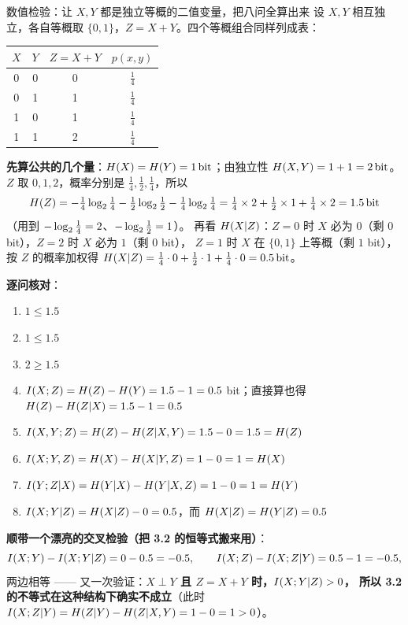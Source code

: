 \documentclass[11pt,a4paper]{ctexart}
\begin{document}
\begin{calc}{数值检验：让 $X,Y$ 都是独立等概的二值变量，把八问全算出来}
设 $X,Y$ 相互独立，各自等概取 $\{0,1\}$，$Z=X+Y$。四个等概组合同样列成表：

\begin{center}
\renewcommand{\arraystretch}{1.3}
\begin{tabular}{c|c|c|c}
\toprule
$X$ & $Y$ & $Z=X+Y$ & $p(x,y)$ \\
\midrule
0 & 0 & 0 & $\frac14$ \\
0 & 1 & 1 & $\frac14$ \\
1 & 0 & 1 & $\frac14$ \\
1 & 1 & 2 & $\frac14$ \\
\bottomrule
\end{tabular}
\end{center}

\textbf{先算公共的几个量}：$H\!\left(X\right)=H\!\left(Y\right)=1\,\text{bit}$；由独立性 $H\!\left(X,Y\right)=1+1=2\,\text{bit}$。
$Z$ 取 $0,1,2$，概率分别是 $\frac14,\frac12,\frac14$，所以
\[
H\!\left(Z\right)=-\tfrac14\log_{2}\tfrac14-\tfrac12\log_{2}\tfrac12-\tfrac14\log_{2}\tfrac14
=\tfrac14\times2+\tfrac12\times1+\tfrac14\times2=1.5\,\text{bit}
\]
（用到 $-\log_{2}\tfrac14=2$、$-\log_{2}\tfrac12=1$）。
再看 $H\!\left(X|Z\right)$：$Z=0$ 时 $X$ 必为 $0$（剩 $0$ bit），$Z=2$ 时 $X$ 必为 $1$（剩 $0$ bit），
$Z=1$ 时 $X$ 在 $\{0,1\}$ 上等概（剩 $1$ bit），按 $Z$ 的概率加权得
$H\!\left(X|Z\right)=\tfrac14\cdot0+\tfrac12\cdot1+\tfrac14\cdot0=0.5\,\text{bit}$。

\textbf{逐问核对}：
\begin{enumerate}[label=(\arabic*),leftmargin=1.9em,itemsep=1pt,topsep=1pt]
  \item $1\le1.5$ \checkmark
  \item $1\le1.5$ \checkmark
  \item $2\ge1.5$ \checkmark
  \item $I\!\left(X;Z\right)=H\!\left(Z\right)-H\!\left(Y\right)=1.5-1=0.5$ bit；直接算也得 $H\!\left(Z\right)-H\!\left(Z|X\right)=1.5-1=0.5$ \checkmark
  \item $I\!\left(X,Y;Z\right)=H\!\left(Z\right)-H\!\left(Z|X,Y\right)=1.5-0=1.5=H\!\left(Z\right)$ \checkmark
  \item $I\!\left(X;Y,Z\right)=H\!\left(X\right)-H\!\left(X|Y,Z\right)=1-0=1=H\!\left(X\right)$ \checkmark
  \item $I\!\left(Y;Z|X\right)=H\!\left(Y|X\right)-H\!\left(Y|X,Z\right)=1-0=1=H\!\left(Y\right)$ \checkmark
  \item $I\!\left(X;Y|Z\right)=H\!\left(X|Z\right)-0=0.5$，而 $H\!\left(X|Z\right)=H\!\left(Y|Z\right)=0.5$ \checkmark
\end{enumerate}

\textbf{顺带一个漂亮的交叉检验（把 3.2 的恒等式搬来用）}：
\[
I\!\left(X;Y\right)-I\!\left(X;Y|Z\right)=0-0.5=-0.5,
\qquad
I\!\left(X;Z\right)-I\!\left(X;Z|Y\right)=0.5-1=-0.5,
\]
两边相等 \checkmark —— 又一次验证：\textbf{$X\perp Y$ 且 $Z=X+Y$ 时，$I\!\left(X;Y|Z\right)>0$，
所以 3.2 的不等式在这种结构下确实不成立}（此时 $I\!\left(X;Z|Y\right)=H\!\left(Z|Y\right)-H\!\left(Z|X,Y\right)=1-0=1>0$）。
\end{calc}
\end{document}
